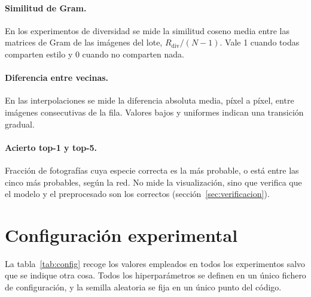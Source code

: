 \documentclass[11pt,a4paper]{article}
\begin{document}
\paragraph{Similitud de Gram.} En los experimentos de diversidad se mide la
similitud coseno media entre las matrices de Gram de las imágenes del lote,
$R_{\text{div}}/(N-1)$. Vale 1 cuando todas comparten estilo y 0 cuando no
comparten nada.

\paragraph{Diferencia entre vecinas.} En las interpolaciones se mide la
diferencia absoluta media, píxel a píxel, entre imágenes consecutivas de la
fila. Valores bajos y uniformes indican una transición gradual.

\paragraph{Acierto top-1 y top-5.} Fracción de fotografías cuya especie
correcta es la más probable, o está entre las cinco más probables, según la
red. No mide la visualización, sino que verifica que el modelo y el
preprocesado son los correctos (sección~\ref{sec:verificacion}).

\section{Configuración experimental}
\label{sec:experimentos}

La tabla~\ref{tab:config} recoge los valores empleados en todos los
experimentos salvo que se indique otra cosa. Todos los hiperparámetros se
definen en un único fichero de configuración, y la semilla aleatoria se fija
en un único punto del código.
\end{document}
